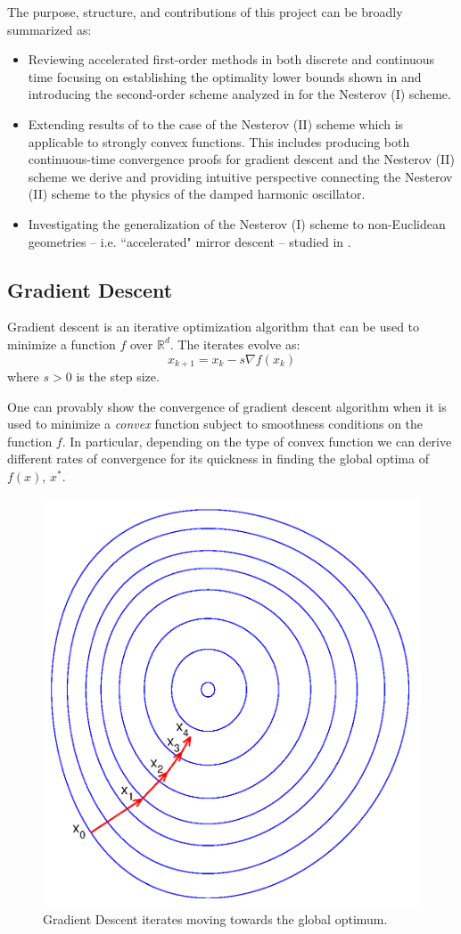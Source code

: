 The purpose, structure, and contributions of this project can be broadly summarized as:
\begin{itemize}
    \item Reviewing accelerated first-order methods in both discrete and continuous time focusing on establishing the optimality lower bounds shown in \cite{nesterov2004introductory} and introducing the second-order scheme analyzed in \cite{su2014differential} for the Nesterov (I) scheme.
    \item Extending results of \cite{su2014differential} to the case of the Nesterov (II) scheme which is applicable to strongly convex functions. This includes producing both continuous-time convergence proofs for gradient descent and the Nesterov (II) scheme we derive and providing intuitive perspective connecting the Nesterov (II) scheme to the physics of the damped harmonic oscillator.
    \item Investigating the generalization of the Nesterov (I) scheme to non-Euclidean geometries -- i.e. ``accelerated" mirror descent -- studied in \cite{krichene2015accelerated}.
\end{itemize}

\subsection{Gradient Descent}

Gradient descent is an iterative optimization algorithm that can be used to minimize a function $f$ over $\mathbb{R}^{d}$. The iterates evolve as:
\begin{equation}
    x_{k+1} = x_k - s \nabla f(x_k)
\end{equation}
where $s > 0$ is the step size. 

One can provably show the convergence of gradient descent algorithm when it is used to minimize a \textit{convex} function subject to smoothness conditions on the function $f$. In particular, depending on the type of convex function we can derive different rates of convergence for its quickness in finding the global optima of $f(x)$, $x^*$. 

\begin{figure}[!h]
\begin{center}
\includegraphics[width=0.2\linewidth]{SourceFiles/plots/Gradient_descent.eps}
\caption{Gradient Descent iterates moving towards the global optimum.}
\end{center}
\end{figure}

